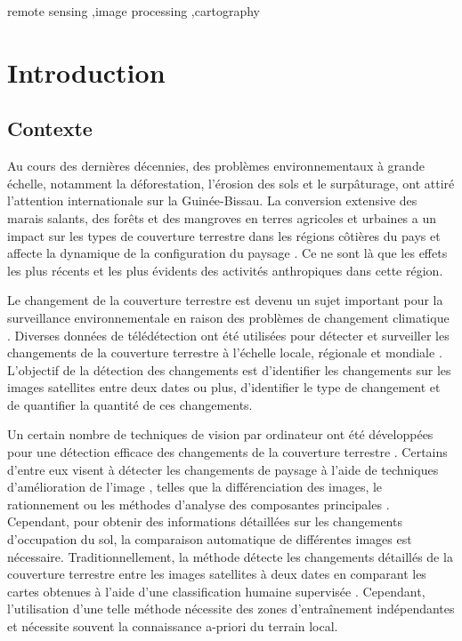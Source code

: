 \documentclass{rfpt}
\begin{document}
\begin{frontmatter}
\begin{keyword}
remote sensing \sep image processing \sep cartography 
\end{keyword}

\end{frontmatter}

\section{Introduction}

\subsection{Contexte}
Au cours des dernières décennies, des problèmes environnementaux à grande échelle, notamment la déforestation, l'érosion des sols et le surpâturage, ont attiré l'attention internationale sur la Guinée-Bissau. La conversion extensive des marais salants, des forêts et des mangroves en terres agricoles et urbaines a un impact sur les types de couverture terrestre dans les régions côtières du pays \cite{Lopes2022,RAIMUNDOLOPES2022106181,CABRAL2017115} et affecte la dynamique de la configuration du paysage \cite{VASCONCELOS2002139,LOPES2023116804}. Ce ne sont là que les effets les plus récents et les plus évidents des activités anthropiques dans cette région. 

Le changement de la couverture terrestre est devenu un sujet important pour la surveillance environnementale en raison des problèmes de changement climatique \cite{Palazot}. Diverses données de télédétection ont été utilisées pour détecter et surveiller les changements de la couverture terrestre à l’échelle locale, régionale et mondiale \cite{Dao}. L’objectif de la détection des changements est d’identifier les changements sur les images satellites entre deux dates ou plus, d’identifier le type de changement et de quantifier la quantité de ces changements. 

Un certain nombre de techniques de vision par ordinateur ont été développées pour une détection efficace des changements de la couverture terrestre \cite{Lenco,Mainguet}. Certains d’entre eux visent à détecter les changements de paysage à l’aide de techniques d’amélioration de l’image \cite{Bouchot}, telles que la différenciation des images, le rationnement ou les méthodes d’analyse des composantes principales \cite{Crettez,SHARMA2023100963}. Cependant, pour obtenir des informations détaillées sur les changements d’occupation du sol, la comparaison automatique de différentes images est nécessaire. Traditionnellement, la méthode détecte les changements détaillés de la couverture terrestre entre les images satellites à deux dates en comparant les cartes obtenues à l’aide d’une classification humaine supervisée \cite{Geroyannis,Blamont}. Cependant, l’utilisation d’une telle méthode nécessite des zones d’entraînement indépendantes et nécessite souvent la connaissance a-priori du terrain local.
\end{document}
